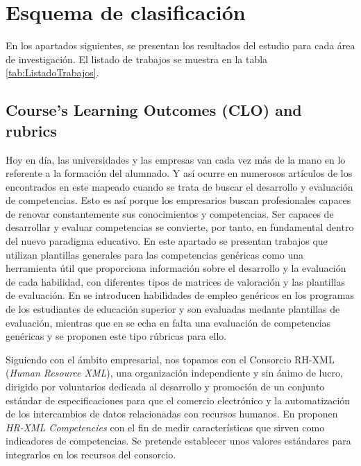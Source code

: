 \section{Esquema de clasificación}

En los apartados siguientes, se presentan los resultados del estudio para cada área de investigación. El listado de trabajos se muestra en la tabla \ref{tab:ListadoTrabajos}.

\subsection{Course’s Learning Outcomes (CLO) and rubrics}
Hoy en día, las universidades y las empresas van cada vez más de la mano en lo referente a la formación del alumnado. Y así ocurre en numerosos artículos de los encontrados en este mapeado cuando se trata de buscar el desarrollo y evaluación de competencias. Esto es así porque los empresarios buscan profesionales capaces de renovar constantemente sus conocimientos y competencias. Ser capaces de desarrollar y evaluar competencias se convierte, por tanto, en fundamental dentro del nuevo paradigma educativo. En este apartado se presentan trabajos que utilizan plantillas generales para las competencias genéricas como una herramienta útil que proporciona información sobre el desarrollo y la evaluación de cada habilidad, con diferentes tipos de matrices de valoración y las plantillas de evaluación. En \cite{Terron-Lopez:2013} se introducen habilidades de empleo genéricos en los programas de los estudiantes de educación superior y son evaluadas medante plantillas de evaluación, mientras que en \cite{Feldt:2009} se echa en falta una evaluación de competencias genéricas y se proponen este tipo rúbricas para ello.

Siguiendo con el ámbito empresarial, nos topamos con el Consorcio RH-XML (\emph{Human Resource XML}), una organización independiente y sin ánimo de lucro, dirigido por voluntarios dedicada al desarrollo y promoción de un conjunto estándar de especificaciones para que el comercio electrónico y la automatización de los intercambios de datos relacionadas con recursos humanos. En \cite{Adelsberger:2008} proponen \emph{HR-XML Competencies} con el fin de medir características que sirven como indicadores de competencias. Se pretende establecer unos valores estándares para integrarlos en los recursos del consorcio.

